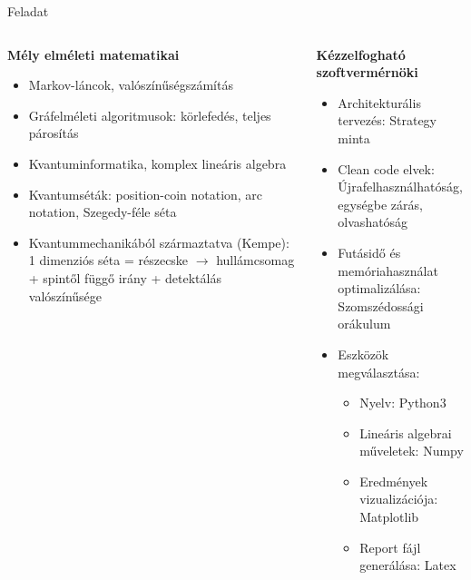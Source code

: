 \documentclass[aspectratio=169]{beamer}
\begin{document}
\begin{frame}{Feladat}

\begin{columns}[t,onlytextwidth]
    \begin{column}{.5\textwidth}
      \begin{center}
        \textbf{Mély elméleti matematikai}
      \end{center}
      \begin{itemize}
          \item Markov-láncok, valószínűségszámítás
          \item Gráfelméleti algoritmusok: körlefedés, teljes párosítás
          \item Kvantuminformatika, komplex lineáris algebra
          \item Kvantumséták: position-coin notation, arc notation, Szegedy-féle séta
          \item Kvantummechanikából származtatva (Kempe): 1 dimenziós séta = részecske $\rightarrow$ hullámcsomag + spintől függő irány + detektálás valószínűsége
      \end{itemize}
    \end{column}
    \begin{column}{.5\textwidth}
      \begin{center}
         \textbf{Kézzelfogható szoftvermérnöki}
      \end{center}
      \begin{itemize}
          \item Architekturális tervezés: Strategy minta
          \item Clean code elvek: Újrafelhasználhatóság, egységbe zárás, olvashatóság
          \item Futásidő és memóriahasználat optimalizálása: Szomszédossági orákulum
          \item Eszközök megválasztása:
          \begin{itemize}
            \item Nyelv: Python3
            \item Lineáris algebrai műveletek: Numpy
            \item Eredmények vizualizációja: Matplotlib
            \item Report fájl generálása: Latex
          \end{itemize}
      \end{itemize}
    \end{column}
  \end{columns}
\end{frame}
\end{document}
